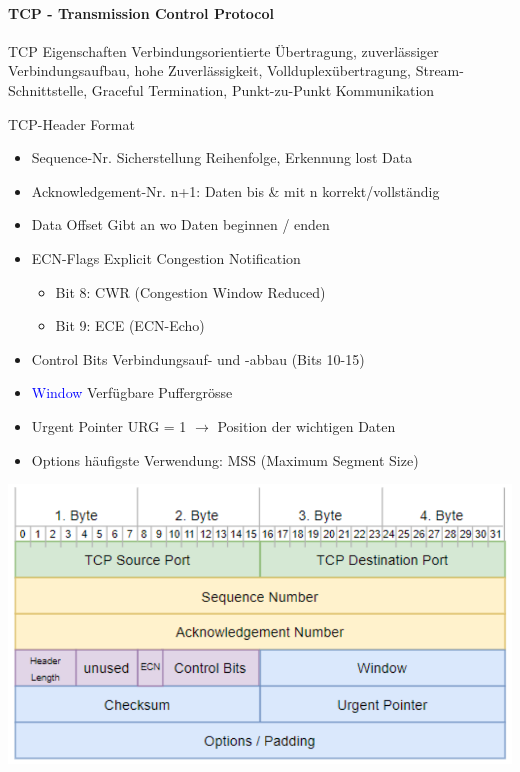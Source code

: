 \paragraph{TCP - Transmission Control Protocol}

\begin{definition}{TCP Eigenschaften} 
    Verbindungsorientierte Übertragung, zuverlässiger Verbindungsaufbau, hohe Zuverlässigkeit, Vollduplexübertragung, Stream-Schnittstelle, Graceful Termination, Punkt-zu-Punkt Kommunikation
\end{definition}

\begin{concept}{TCP-Header Format}
    \begin{itemize}
        \item \textcolor{darkcorn}{Sequence-Nr.} {\small Sicherstellung Reihenfolge, Erkennung lost Data}
        \item \textcolor{darkcorn}{Acknowledgement-Nr.} {\small n+1: Daten bis \& mit n korrekt/vollständig}
        \item \textcolor{darkpurple}{Data Offset} Gibt an wo Daten beginnen / enden
        \item \textcolor{darkpurple}{ECN-Flags} Explicit Congestion Notification
        {\small
        \begin{itemize}
            \item Bit 8: CWR (Congestion Window Reduced)
            \item Bit 9: ECE (ECN-Echo)
        \end{itemize}}
        \item \textcolor{darkpurple}{Control Bits} Verbindungsauf- und -abbau (Bits 10-15)
        \item \textcolor{blue}{Window} Verfügbare Puffergrösse 
        \item \textcolor{darkpurple}{Urgent Pointer} URG = 1 $\rightarrow$ Position der wichtigen Daten
        \item \textcolor{darkpurple}{Options} häufigste Verwendung: MSS (Maximum Segment Size)
    \end{itemize}
    \includegraphics[width=0.8\linewidth, height=0.36\linewidth]{images/tcpheader.png}
\end{concept}

